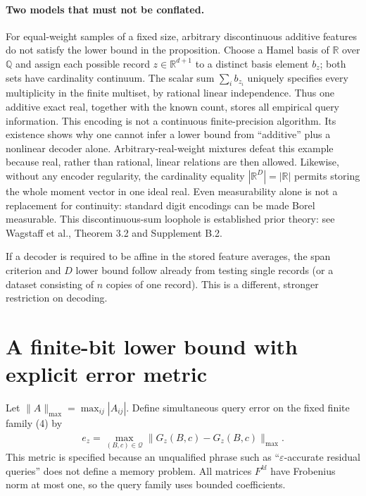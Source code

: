 \documentclass[11pt]{article}
\newcommand{\R}{\mathbb R}
\begin{document}
\paragraph{Two models that must not be conflated.}
For equal-weight samples of a fixed size, arbitrary discontinuous
additive features do not satisfy the lower bound in the proposition.
Choose a Hamel basis of $\R$ over $\mathbb Q$ and assign each possible
record $z\in\R^{d+1}$ to a distinct basis element $b_z$; both sets
have cardinality continuum. The scalar sum $\sum_i b_{z_i}$ uniquely
specifies every multiplicity in the finite multiset, by rational
linear independence. Thus one additive exact real, together with the
known count, stores all empirical query information. This encoding is
not a continuous finite-precision algorithm. Its existence shows why
one cannot infer a lower bound from ``additive'' plus a nonlinear
decoder alone. Arbitrary-real-weight mixtures defeat this example
because real, rather than rational, linear relations are then allowed.
Likewise, without any encoder regularity, the cardinality equality
$|\R^D|=|\R|$ permits storing the whole moment vector in one ideal
real. Even measurability alone is not a replacement for continuity:
standard digit encodings can be made Borel measurable.
This discontinuous-sum loophole is established prior theory: see
Wagstaff et al., Theorem 3.2 and Supplement B.2\cite{wagstaff}.

If a decoder is required to be affine in the stored feature averages,
the span criterion and $D$ lower bound follow already from testing
single records (or a dataset consisting of $n$ copies of one record).
This is a different, stronger restriction on decoding.

\section{A finite-bit lower bound with explicit error metric}

Let $\|A\|_{\max}=\max_{ij}|A_{ij}|$. Define simultaneous query error
on the fixed finite family (4) by
\[
 e_z=\max_{(B,c)\in\mathcal Q}
       \|\widehat G_z(B,c)-G_z(B,c)\|_{\max}.\tag{6}
\]
This metric is specified because an unqualified phrase such as
``$\varepsilon$-accurate residual queries'' does not define a memory
problem. All matrices $F^{kl}$ have Frobenius norm at most one, so
the query family uses bounded coefficients.
\end{document}
